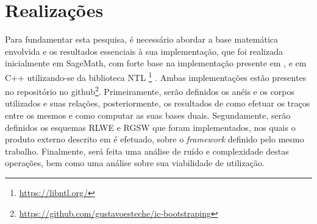 \section{\Large Realizações}

Para fundamentar esta pesquisa, é necessário abordar a base matemática envolvida e os
resultados essenciais à sua implementação, que foi realizada inicialmente em SageMath, com forte base na implementação presente em \cite{SBSeg21:PM}, e em C++ utilizando-se da biblioteca NTL \footnote{\url{https://libntl.org/}} \cite{shoupNTL}. Ambas implementações estão presentes no repositório no github\footnote{\url{https://github.com/gustavoesteche/ic-bootstraping}}. Primeiramente, serão definidos
os anéis e os corpos utilizados e suas relações, posteriormente, os resultados de como 
efetuar os traços entre os mesmos e como computar as suas bases duais. 
Segundamente, serão definidos os esquemas RLWE e RGSW que foram implementados, 
nos quais o produto externo descrito em \cite{lw23I} é efetuado, sobre o \emph{framework} 
definido pelo mesmo trabalho. Finalmente, será feita uma análise de ruído e complexidade 
destas operações, bem como uma análise sobre sua viabilidade de utilização. 













